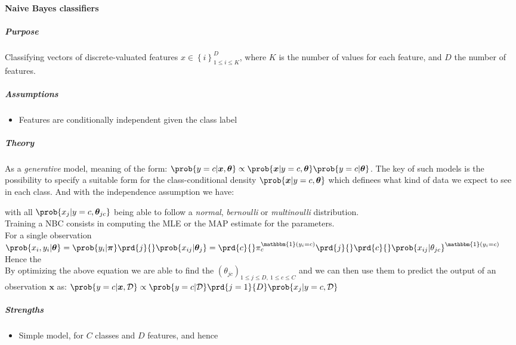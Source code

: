 \paragraph{Naive Bayes classifiers}
\subparagraph{Purpose}
Classifying vectors of discrete-valuated features $x\in\left\{i\right\}_{1\leq i \leq K}^{D}$, where $K$ is the number 
of values for each feature, and $D$ the number of features.
\subparagraph{Assumptions}
\begin{itemize}
    \item Features are conditionally independent given the class label
\end{itemize}
\subparagraph{Theory}
As a \emph{generative} model, meaning of the form:
$\prob{y=c|\bm{x}, \bm{\theta}} \propto \prob{\bm{x}|y=c,\bm{\theta}}
\prob{y=c|\bm{\theta}}$. The key of such models is the possibility
to specify a suitable form for the class-conditional density 
$\prob{\bm{x}|y=c, \bm{\theta}}$ which definees what kind of data we 
expect to see in each class. And with the independence assumption we 
have:
\begin{center}
\end{center}
with all $\prob{x_{j}|y=c,\bm{\theta}_{jc}}$ being able to 
follow a \textit{normal}, \textit{bernoulli} or \textit{multinoulli} 
distribution.\\
Training a NBC consists in computing the MLE or the MAP estimate for the
parameters.\\
For a single observation
$\prob{x_{i}, y_{i}|\bm{\theta}} = \prob{y_{i}|\bm{\pi}}\prd{j}{}\prob{x_{ij}|\bm{\theta}_{j}} = 
\prd{c}{}\pi_{c}^{\mathbbm{1}(y_{i}=c)}\prd{j}{}\prd{c}{}\prob{x_{ij}|
\theta_{jc}}^{\mathbbm{1}(y_{i}=c)}
$\\ 
Hence the \\
By optimizing the above equation we are able to find the $\left(\theta_{jc}\right)_{1\leq j \leq D,~ 1\leq c\leq C}$ and we can then use them to
predict the output of an observation $\bm{x}$ as: $\prob{y=c|\bm{x},\mathcal{D}} \propto \prob{y=c|\mathcal{D}}\prd{j=1}{D}\prob{x_{j}|y=c,\mathcal{D}}$

\subparagraph{Strengths}
\begin{itemize}
    \item Simple model, for $C$ classes and $D$ features, and hence 
\end{itemize}

